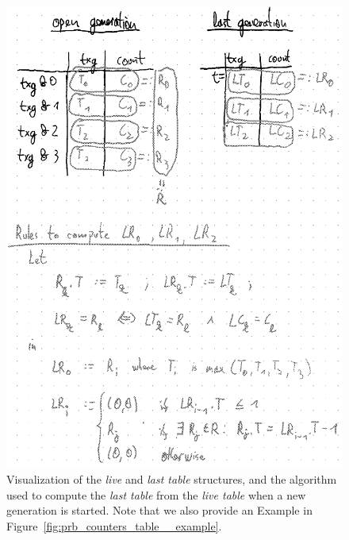 \documentclass[12pt,a4paper,twoside]{book}
\begin{document}
\begin{figure}[H]
    \centering
    \includegraphics[width=\textwidth]{fig/prb_counters_table__computation}
    \caption{
        Visualization of the \textit{live} and \textit{last table} structures, and the algorithm used to compute the \textit{last table} from the \textit{live table} when a new generation is started.
        Note that we also provide an Example in Figure~\ref{fig:prb_counters_table__example}.
    }
    \label{fig:prb_counters_table__computation}
\end{figure}
\end{document}
